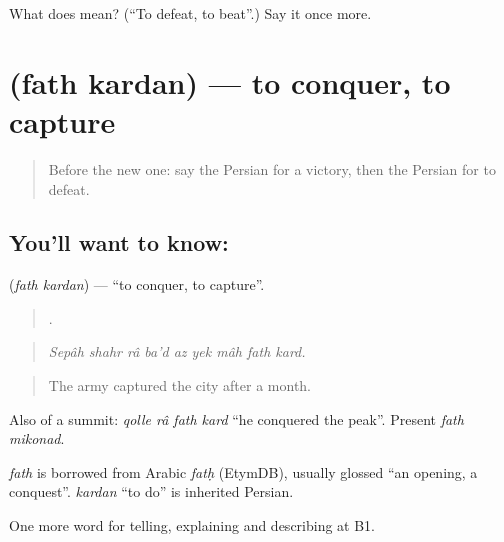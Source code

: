 \begin{tcolorbox}[breakable,colback=teal!4,colframe=teal!35!black,title={Before you move on}]
What does   mean? (\textquotedblleft{}To defeat, to beat\textquotedblright{}.) Say it once more.
\end{tcolorbox}
\section[\texorpdfstring{\fa{فتح} \fa{کردن} (fath kardan)}{فتح کردن (fath kardan)}]{  (fath kardan) — to conquer, to capture}

\label{lesson:FA-C351-fath-kardan}



\begin{quote}
Before the new one: say the Persian for a victory, then the Persian for to defeat.
\end{quote}

\subsection*{You'll want to know:  }
\textbf{ } (\emph{fath kardan}) — \textquotedblleft{}to conquer, to capture\textquotedblright{}.

\begin{quote}
        .
\end{quote}

\begin{quote}
\emph{Sepâh shahr râ ba'd az yek mâh fath kard.}
\end{quote}

\begin{quote}
The army captured the city after a month.
\end{quote}

Also of a summit: \emph{qolle râ fath kard} \textquotedblleft{}he conquered the peak\textquotedblright{}. Present \emph{fath mikonad}.

\begin{cousinweb}
\emph{fath} is borrowed from Arabic \emph{fatḥ} (EtymDB), usually glossed \textquotedblleft{}an opening, a conquest\textquotedblright{}. \emph{kardan} \textquotedblleft{}to do\textquotedblright{} is inherited Persian.
\end{cousinweb}

\begin{grammarlens}[title={What you've built}]
One more word for telling, explaining and describing at B1.
\end{grammarlens}

